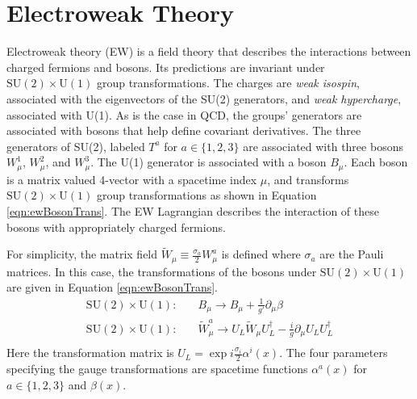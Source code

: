 \section{Electroweak Theory}\label{sec:ewTheory}\label{sec:thyEW}
Electroweak theory (EW) is a field theory that describes the interactions between charged fermions and bosons.
Its predictions are invariant under $\text{SU}(2)\times\text{U}(1)$ group transformations.
The charges are \emph{weak isospin}, associated with the eigenvectors of the SU(2) generators, and \emph{weak hypercharge}, associated with U(1).
As is the case in QCD, the groups' generators are associated with bosons that help define covariant derivatives.
The three generators of SU(2), labeled $T^a$ for $a\in\{1,2,3\}$ are associated with three bosons $W_\mu^1$, $W_\mu^2$, and $W_\mu^3$.
The U(1) generator is associated with a boson $B_\mu$.
Each boson is a matrix valued 4-vector with a spacetime index $\mu$, and transforms $\text{SU}(2)\times\text{U}(1)$ group transformations as shown in Equation \ref{eqn:ewBosonTrans}.
The EW Lagrangian describes the interaction of these bosons with appropriately charged fermions.

For simplicity, the matrix field $\widetilde{W}_\mu\equiv\frac{\sigma_a}{2}W_\mu^a$ is defined where $\sigma_a$ are the Pauli matrices.
In this case, the transformations of the bosons under $\text{SU}(2)\times\text{U}(1)$ are given in Equation \ref{eqn:ewBosonTrans}.
\begin{equation}\begin{split}\label{eqn:ewBosonTrans}
    \text{SU}(2)\times\text{U}(1):\quad& B_\mu\to B_\mu+\frac{1}{g'}\partial_\mu\beta \\
    \text{SU}(2)\times\text{U}(1):\quad& \widetilde{W}^a_\mu\to U_L\widetilde{W}_\mu U^\dagger_L -\frac{i}{g}\partial_\mu U_LU^\dagger_L\\
\end{split}\end{equation}
Here the transformation matrix is $U_L=\exp{i\frac{\sigma_i}{2}\alpha^i(x)}$.
The four parameters specifying the gauge transformations are spacetime functions $\alpha^a(x)$ for $a\in\{1,2,3\}$ and $\beta(x)$.


